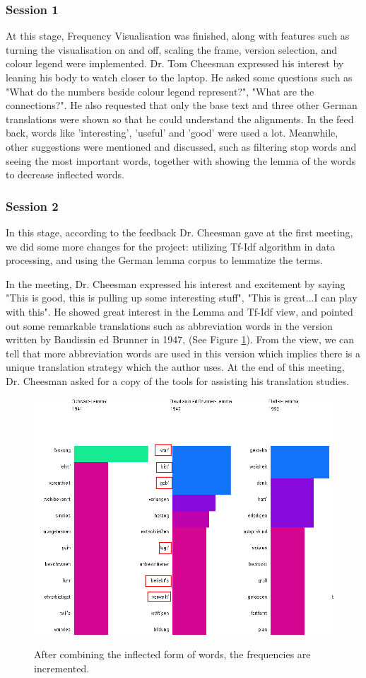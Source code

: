 \subsubsection{Session 1}

At this stage, Frequency Visualisation was finished, along with features such as turning the visualisation on and off, scaling the frame, version selection, and colour legend were implemented. Dr. Tom Cheesman expressed his interest by leaning his body to watch closer to 
the laptop. He asked some questions such as "What do the numbers beside colour legend represent?", "What are the connections?". He also requested that only the base text and three other German translations were shown so that he could understand the alignments. In the feed back, words like 'interesting', 'useful' and 'good' were used a lot. Meanwhile, other suggestions were mentioned and discussed, such as filtering stop words and seeing the most important words, together with showing the lemma of the words to decrease inflected words.

\subsubsection{Session 2}

In this stage, according to the feedback Dr. Cheesman gave at the first meeting, we did some more changes for the project: utilizing Tf-Idf algorithm in data processing, and using the German lemma corpus to lemmatize the terms. 

In the meeting, Dr. Cheesman expressed his interest and excitement by saying "This is good, this is pulling up some interesting stuff", "This is great...I can play with this". He showed great interest in the Lemma and Tf-Idf view, and pointed out some remarkable translations such as abbreviation words in the version written by Baudissin ed Brunner in 1947, (See Figure \ref{fig:feedback}). From the view, we can tell that more abbreviation words are used in this version which implies there is a unique translation strategy which the author uses. At the end of this meeting, Dr. Cheesman asked for a copy of the tools for assisting his translation studies.

\begin{figure}[H]
	\centering	
	\includegraphics[scale=0.5]{Figs/Marking-Feedback}\\[1ex]
	\caption{After combining the inflected form of words, the frequencies are incremented.} 
	\label{fig:feedback}
\end{figure} 





